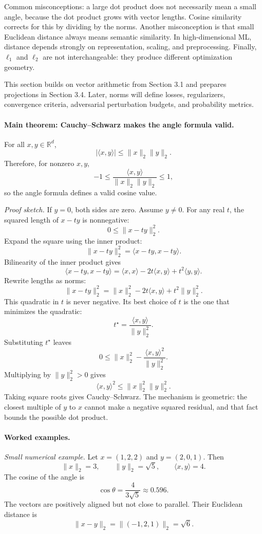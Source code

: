 Common misconceptions: a large dot product does not necessarily mean a small angle, because the dot product grows with vector lengths. Cosine similarity corrects for this by dividing by the norms. Another misconception is that small Euclidean distance always means semantic similarity. In high-dimensional ML, distance depends strongly on representation, scaling, and preprocessing. Finally, \(\ell_1\) and \(\ell_2\) are not interchangeable: they produce different optimization geometry.

This section builds on vector arithmetic from Section 3.1 and prepares projections in Section 3.4. Later, norms will define losses, regularizers, convergence criteria, adversarial perturbation budgets, and probability metrics.

\paragraph{Main theorem: Cauchy--Schwarz makes the angle formula valid.}
For all \(x,y\in\mathbb{R}^d\),
\[
|\langle x,y\rangle|\le \|x\|_2\|y\|_2.
\]
Therefore, for nonzero \(x,y\),
\[
-1\le \frac{\langle x,y\rangle}{\|x\|_2\|y\|_2}\le 1,
\]
so the angle formula defines a valid cosine value.

\emph{Proof sketch.} If \(y=0\), both sides are zero. Assume \(y\ne 0\). For any real \(t\), the squared length of \(x-ty\) is nonnegative:
\[
0\le \|x-ty\|_2^2.
\]
Expand the square using the inner product:
\[
\|x-ty\|_2^2=\langle x-ty,x-ty\rangle.
\]
Bilinearity of the inner product gives
\[
\langle x-ty,x-ty\rangle
=\langle x,x\rangle-2t\langle x,y\rangle+t^2\langle y,y\rangle.
\]
Rewrite lengths as norms:
\[
\|x-ty\|_2^2=\|x\|_2^2-2t\langle x,y\rangle+t^2\|y\|_2^2.
\]
This quadratic in \(t\) is never negative. Its best choice of \(t\) is the one that minimizes the quadratic:
\[
t^\star=\frac{\langle x,y\rangle}{\|y\|_2^2}.
\]
Substituting \(t^\star\) leaves
\[
0\le \|x\|_2^2-\frac{\langle x,y\rangle^2}{\|y\|_2^2}.
\]
Multiplying by \(\|y\|_2^2>0\) gives
\[
\langle x,y\rangle^2\le \|x\|_2^2\|y\|_2^2.
\]
Taking square roots gives Cauchy--Schwarz. The mechanism is geometric: the closest multiple of \(y\) to \(x\) cannot make a negative squared residual, and that fact bounds the possible dot product.

\paragraph{Worked examples.}
\emph{Small numerical example.} Let \(x=(1,2,2)\) and \(y=(2,0,1)\). Then
\[
\|x\|_2=3,\qquad \|y\|_2=\sqrt5,\qquad \langle x,y\rangle=4.
\]
The cosine of the angle is
\[
\cos\theta=\frac{4}{3\sqrt5}\approx 0.596.
\]
The vectors are positively aligned but not close to parallel. Their Euclidean distance is
\[
\|x-y\|_2=\|(-1,2,1)\|_2=\sqrt6.
\]

